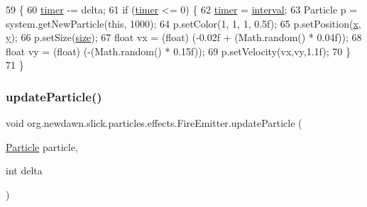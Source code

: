 \begin{DoxyCode}
59                                                          \{
60         \mbox{\hyperlink{classorg_1_1newdawn_1_1slick_1_1particles_1_1effects_1_1_fire_emitter_a60cf4c23819ed185668f9bc059f678f3}{timer}} -= delta;
61         \textcolor{keywordflow}{if} (\mbox{\hyperlink{classorg_1_1newdawn_1_1slick_1_1particles_1_1effects_1_1_fire_emitter_a60cf4c23819ed185668f9bc059f678f3}{timer}} <= 0) \{
62             \mbox{\hyperlink{classorg_1_1newdawn_1_1slick_1_1particles_1_1effects_1_1_fire_emitter_a60cf4c23819ed185668f9bc059f678f3}{timer}} = \mbox{\hyperlink{classorg_1_1newdawn_1_1slick_1_1particles_1_1effects_1_1_fire_emitter_a007bd6dc16865e8d71b373bbd29acd1f}{interval}};
63             Particle p = system.getNewParticle(\textcolor{keyword}{this}, 1000);
64             p.setColor(1, 1, 1, 0.5f);
65             p.setPosition(\mbox{\hyperlink{classorg_1_1newdawn_1_1slick_1_1particles_1_1effects_1_1_fire_emitter_a0a4e74935fd83b2cc185add63d715c50}{x}}, \mbox{\hyperlink{classorg_1_1newdawn_1_1slick_1_1particles_1_1effects_1_1_fire_emitter_afa9422fae980440d2ff94c2e115dde3c}{y}});
66             p.setSize(\mbox{\hyperlink{classorg_1_1newdawn_1_1slick_1_1particles_1_1effects_1_1_fire_emitter_a56f377cd2920bfb430498077465db884}{size}});
67             \textcolor{keywordtype}{float} vx = (float) (-0.02f + (Math.random() * 0.04f));
68             \textcolor{keywordtype}{float} vy = (float) (-(Math.random() * 0.15f));
69             p.setVelocity(vx,vy,1.1f);
70         \}
71     \}
\end{DoxyCode}
\mbox{\label{classorg_1_1newdawn_1_1slick_1_1particles_1_1effects_1_1_fire_emitter_a82aca444c3f089dd9d2c84f028e1f35b}} 
\subsubsection{\texorpdfstring{update\+Particle()}{updateParticle()}}
{\footnotesize\ttfamily void org.\+newdawn.\+slick.\+particles.\+effects.\+Fire\+Emitter.\+update\+Particle (\begin{DoxyParamCaption}\item[{\mbox{\hyperlink{classorg_1_1newdawn_1_1slick_1_1particles_1_1_particle}{Particle}}}]{particle,  }\item[{int}]{delta }\end{DoxyParamCaption})\hspace{0.3cm}{\ttfamily [inline]}}

